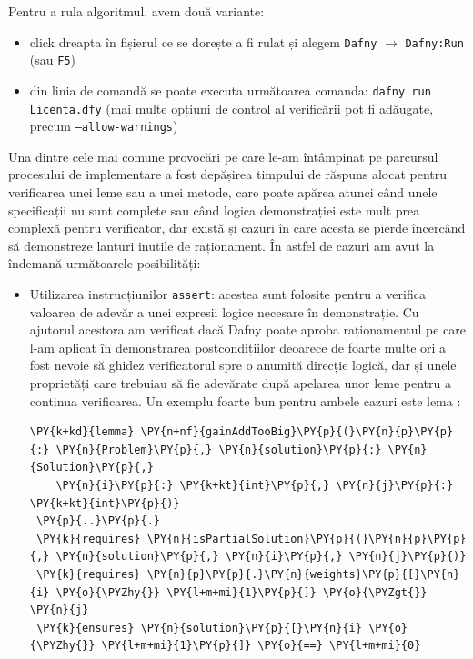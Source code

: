 \begin{sloppypar}
 Pentru a rula algoritmul, avem două variante:
 \begin{itemize}
     \item click dreapta în fișierul ce se dorește a fi rulat și alegem \texttt{Dafny} $\rightarrow$ \texttt{Dafny:Run} (sau \texttt{F5})
     \item din linia de comandă se poate executa următoarea comanda: \texttt{dafny run Licenta.dfy} (mai multe opțiuni de control al verificării pot fi adăugate, precum \texttt{--allow-warnings})
 \end{itemize}
 \par
Una dintre cele mai comune provocări pe care le-am întâmpinat pe parcursul procesului de implementare a fost depășirea timpului de răspuns alocat pentru verificarea unei leme sau a unei metode, care poate apărea atunci când unele specificații nu sunt complete sau când logica demonstrației este mult prea complexă pentru verificator, dar există și cazuri în care acesta se pierde încercând să demonstreze lanțuri inutile de raționament. \cite{verification_optimization} În astfel de cazuri am avut la îndemană următoarele posibilități:
\begin{itemize}
    \item Utilizarea instrucțiunilor \texttt{assert}: acestea sunt folosite pentru a verifica valoarea de adevăr a unei expresii logice necesare în demonstrație. Cu ajutorul acestora am verificat dacă Dafny poate aproba raționamentul pe care l-am aplicat în demonstrarea postcondițiilor deoarece de foarte multe ori a fost nevoie să ghidez verificatorul spre o anumită direcție logică, dar și unele proprietăți care trebuiau să fie adevărate după apelarea unor leme pentru a continua verificarea. Un exemplu foarte bun pentru ambele cazuri este lema :
   \begin{Verbatim}[commandchars=\\\{\}]
\PY{k+kd}{lemma} \PY{n+nf}{gainAddTooBig}\PY{p}{(}\PY{n}{p}\PY{p}{:} \PY{n}{Problem}\PY{p}{,} \PY{n}{solution}\PY{p}{:} \PY{n}{Solution}\PY{p}{,} 
    \PY{n}{i}\PY{p}{:} \PY{k+kt}{int}\PY{p}{,} \PY{n}{j}\PY{p}{:} \PY{k+kt}{int}\PY{p}{)} 
 \PY{p}{..}\PY{p}{.}
 \PY{k}{requires} \PY{n}{isPartialSolution}\PY{p}{(}\PY{n}{p}\PY{p}{,} \PY{n}{solution}\PY{p}{,} \PY{n}{i}\PY{p}{,} \PY{n}{j}\PY{p}{)}
 \PY{k}{requires} \PY{n}{p}\PY{p}{.}\PY{n}{weights}\PY{p}{[}\PY{n}{i} \PY{o}{\PYZhy{}} \PY{l+m+mi}{1}\PY{p}{]} \PY{o}{\PYZgt{}} \PY{n}{j}
 \PY{k}{ensures} \PY{n}{solution}\PY{p}{[}\PY{n}{i} \PY{o}{\PYZhy{}} \PY{l+m+mi}{1}\PY{p}{]} \PY{o}{==} \PY{l+m+mi}{0}

\end{Verbatim}
\end{itemize}
\end{sloppypar}

